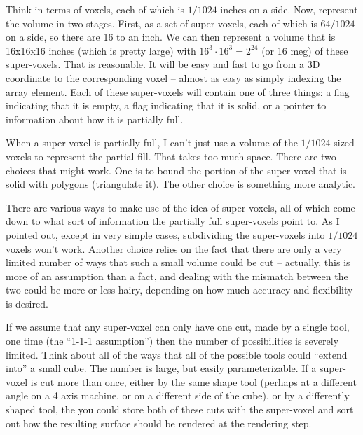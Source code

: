 \documentclass[titlepage,oneside,10pt]{article}
\begin{document}
Think in terms of voxels, each of which is $1/1024$ inches on a
side. Now, represent the volume in two stages. First, as a set of
super-voxels, each of which is $64/1024$ on a side, so there are 16 to
an inch. We can then represent a volume that is 16x16x16 inches (which
is pretty large) with $16^{3}\cdot 16^{3} = 2^{24}$ (or 16 meg) of
these super-voxels. That is reasonable. It will be easy and fast to go
from a 3D coordinate to the corresponding voxel -- almost as easy as 
simply indexing the array element. Each of these super-voxels will
contain one of three things: a flag indicating that it is empty, a
flag indicating that it is solid, or a pointer to information about
how it is partially full.

When a super-voxel is partially full, I can't just use a volume of the
$1/1024$-sized voxels to represent the partial fill. That takes too
much space. There are two choices that might work. One is to bound the
portion of the super-voxel that is solid with polygons (triangulate
it). The other choice is something more analytic.

There are various ways to make use of the idea of super-voxels, all of
which come down to what sort of information the partially full
super-voxels point to. As I pointed out, except in very simple cases,
subdividing the super-voxels into $1/1024$ voxels won't work. Another
choice relies on the fact that there are only a very limited number of
ways that such a small volume could be cut -- actually, this is more of
an assumption than a fact, and dealing with the mismatch between the
two could be more or less hairy, depending on how much accuracy and
flexibility is desired.

If we assume that any super-voxel can only have one cut, made by a
single tool, one time (the ``1-1-1 assumption'') then the number of
possibilities is severely limited. Think about all of the ways that
all of the possible tools could ``extend into'' a small cube. The
number is large, but easily parameterizable. If a super-voxel is cut
more than once, either by the same shape tool (perhaps at a different
angle on a 4 axis machine, or on a different side of the cube), or by
a differently shaped tool, the you could store both of these cuts with
the super-voxel and sort out how the resulting surface should be
rendered at the rendering step.
\end{document}
